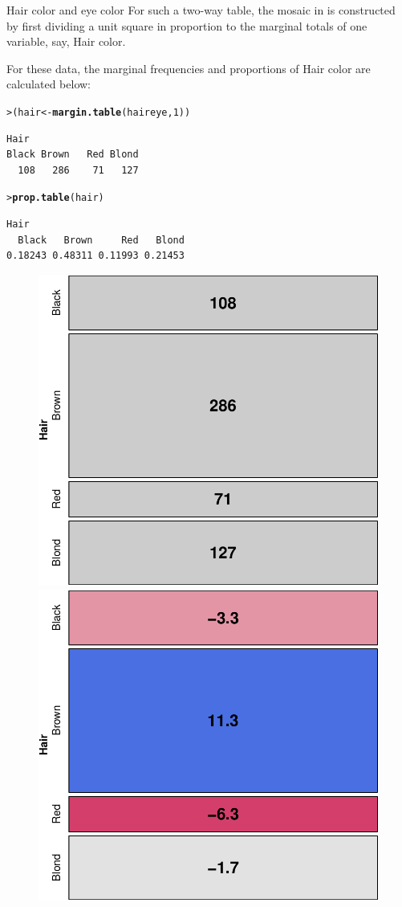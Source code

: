 \documentclass[10pt,krantz2]{krantz}\usepackage[]{graphicx}\usepackage[]{color}
\makeatletter
\newcommand{\hlnum}[1]{\textcolor[rgb]{0.686,0.059,0.569}{#1}}%
\newcommand{\hlstd}[1]{\textcolor[rgb]{0.345,0.345,0.345}{#1}}%
\newcommand{\hlkwb}[1]{\textcolor[rgb]{0.69,0.353,0.396}{#1}}%
\newcommand{\hlkwd}[1]{\textcolor[rgb]{0.737,0.353,0.396}{\textbf{#1}}}%
\newenvironment{kframe}{%
 \def\at@end@of@kframe{}%
 \ifinner\ifhmode%
  \def\at@end@of@kframe{\end{minipage}}%
  \begin{minipage}{\columnwidth}%
 \fi\fi%
 \def\FrameCommand##1{\hskip\@totalleftmargin \hskip-\fboxsep
 \colorbox{shadecolor}{##1}\hskip-\fboxsep
     \hskip-\linewidth \hskip-\@totalleftmargin \hskip\columnwidth}%
 \MakeFramed {\advance\hsize-\width
   \@totalleftmargin\z@ \linewidth\hsize
   \@setminipage}}%
 {\par\unskip\endMakeFramed%
 \at@end@of@kframe}
\newenvironment{knitrout}{}{} %
\renewenvironment{knitrout}{\small\renewcommand{\baselinestretch}{.85}}{} %
\makeatother
\begin{document}
\begin{Example}[haireye2a]{Hair color and eye color}
For such a two-way table, the mosaic in  is constructed
by first dividing a unit square in proportion to the marginal
totals of one variable, say, Hair color.

For these data, the marginal frequencies and proportions of Hair color are calculated below:
\begin{knitrout}
\color{fgcolor}\begin{kframe}
\begin{alltt}
\hlstd{> }\hlstd{(hair} \hlkwb{<-} \hlkwd{margin.table}\hlstd{(haireye,} \hlnum{1}\hlstd{))}
\end{alltt}
\begin{verbatim}
Hair
Black Brown   Red Blond 
  108   286    71   127 
\end{verbatim}
\begin{alltt}
\hlstd{> }\hlkwd{prop.table}\hlstd{(hair)}
\end{alltt}
\begin{verbatim}
Hair
  Black   Brown     Red   Blond 
0.18243 0.48311 0.11993 0.21453 
\end{verbatim}
\end{kframe}
\end{knitrout}

\begin{knitrout}
\color{fgcolor}\begin{figure}[!htbp]

\centerline{\includegraphics[width=.49\textwidth]{ch05/fig/haireye-mos4-1} 
\includegraphics[width=.49\textwidth]{ch05/fig/haireye-mos4-2} }


\end{figure}
\end{knitrout}
\end{Example}
\end{document}
